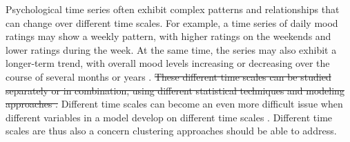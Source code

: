\documentclass[man, 12pt, a4paper, mask]{apa7}
\theoremstyle{break}
\theoremstyle{plain}
\begin{document}
Psychological time series often exhibit complex patterns and relationships that can change over different time scales. For example, a time series of daily mood ratings may show a weekly pattern, with higher ratings on the weekends and lower ratings during the week. At the same time, the series may also exhibit a longer-term trend, with overall mood levels increasing or decreasing over the course of several months or years \citep[e.g.,][]{Ram2014}. \sout{These different time scales can be studied separately or in combination, using different statistical techniques and modeling approaches \citep[][]{bertenthal2007, jeronimus2019a}.} Different time scales can become an even more difficult issue when different variables in a model develop on different time scales \citep{bringmann2022b}. Different time scales are thus also a concern clustering approaches should be able to address.
\end{document}
